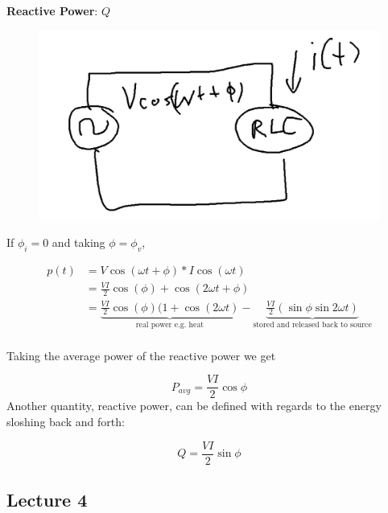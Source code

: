 \documentclass[../notes.tex]{subfiles}
\begin{document}
\begin{definition}
	\textbf{Reactive Power}: $ Q $ 


	\begin{figure}[H]
		\centering
		\includegraphics[width=0.8\linewidth]{img/image_2022-09-12-11-49-46.png}
	\end{figure}


	If $ \phi_i = 0$ and taking $ \phi = \phi_v $,

	\begin{equation}
		\begin{split}
			p(t) &= V\cos(\omega t + \phi) * I \cos(\omega t) \\
					 &= \frac{VI}{2} \cos(\phi) + \cos(2\omega t + \phi) \\
					 &= \underbrace{\frac{VI}{2} \cos(\phi)(1 + \cos(2 \omega t)}_{\text{real power e.g. heat}} 
					 - \underbrace{\frac{VI}{2} (\sin \phi \sin 2 \omega t)}_{\text{stored and released back to source}} \\
		\end{split}
	\end{equation}

	Taking the average power of the reactive power we get 

	\begin{equation}
		P_{avg} = \frac{VI}{2} \cos\phi
	\end{equation}
	Another quantity, reactive power, can be defined with regards to the energy sloshing back and forth:

	\begin{equation}
		Q = \frac{VI}{2} \sin \phi
		\label{eq:349:reactive_power_q}
	\end{equation}
	

\end{definition}

\subsection{Lecture 4}
\end{document}
